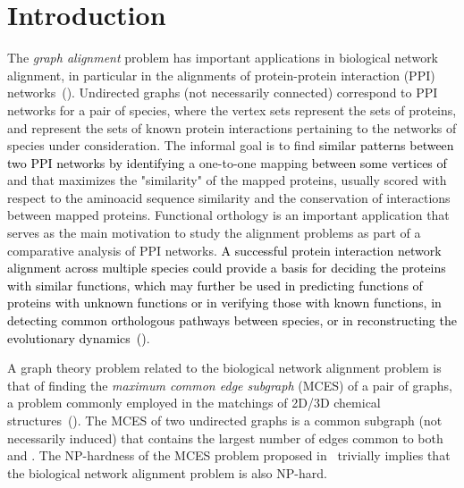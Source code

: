 \documentclass[final]{dmtcs-episciences}
\newcommand\mar[1]{\textcolor{black}{#1}}
\newcommand\fer[1]{\textcolor{black}{#1}}
\begin{document}
\section{Introduction}\label{sec:intro}
The  \emph{ graph alignment} problem has important applications in biological network alignment, in particular 
in the alignments of protein-protein interaction (PPI) 
networks~(\citet{AbakaBE13,AladagE13,sharan06,ZaslavskiyBV09,beams13}). 
Undirected graphs  (not necessarily connected) correspond to PPI networks 
for a pair of species, where  the vertex sets  represent the sets of proteins, and 
 represent the sets of known protein interactions pertaining to the   
networks of species under consideration. 
The informal goal is to find \mar{similar patterns between two PPI networks by identifying} a one-to-one mapping 
\mar{between some vertices of}  and  that maximizes the "similarity" of the mapped proteins, usually
scored with respect to the aminoacid sequence similarity and 
the conservation of interactions between mapped proteins. Functional orthology is an important application that
serves as the main motivation to study the alignment problems as part of a comparative analysis of PPI networks.  
\fer{A successful protein interaction network alignment across multiple species could provide a basis for deciding the proteins with similar functions, which may further 
be used in predicting functions of proteins with unknown functions or in verifying those with known functions, in detecting common orthologous pathways between species, or in reconstructing the evolutionary dynamics~(\citet{pmid28194172})}. 

A graph theory problem related to the biological network alignment problem is that 
of finding the  \emph{ maximum common edge subgraph} (MCES) of a pair of graphs, a problem 
commonly employed in 
the matchings of 2D/3D chemical structures~(\citet{Raymond02maximumcommon}). 
The MCES of two undirected graphs 
 is a common subgraph (not necessarily induced) that contains the largest number of edges common to both 
and . The NP-hardness of the MCES problem proposed in~\citet{GareyJ79} trivially implies 
that the biological network alignment problem is also NP-hard. 
\end{document}
